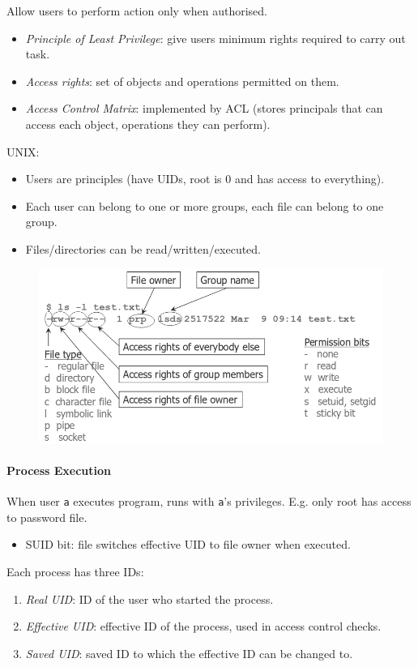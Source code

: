 \documentclass[twocolumn,english]{article}
\begin{document}
Allow users to perform action only when authorised.
\begin{itemize}
\item \emph{Principle of Least Privilege}: give users minimum rights required
to carry out task.
\item \emph{Access rights}: set of objects and operations permitted on them.
\item \emph{Access Control Matrix}: implemented by ACL (stores principals
that can access each object, operations they can perform).
\end{itemize}
UNIX:
\begin{itemize}
\item Users are principles (have UIDs, root is 0 and has access to everything).
\item Each user can belong to one or more groups, each file can belong to
one group.
\item Files/directories can be read/written/executed.
\end{itemize}
\begin{figure}[H]
\centering{}\includegraphics[width=0.6\linewidth]{img/linux-file}
\end{figure}

\paragraph{Process Execution}

When user \texttt{a} executes program, runs with \texttt{a}'s privileges.
E.g. only root has access to password file.
\begin{itemize}
\item SUID bit: file switches effective UID to file owner when executed.
\end{itemize}
Each process has three IDs:
\begin{enumerate}
\item \emph{Real UID}: ID of the user who started the process.
\item \emph{Effective UID}: effective ID of the process, used in access
control checks.
\item \emph{Saved UID}: saved ID to which the effective ID can be changed
to.
\end{enumerate}
\end{document}

